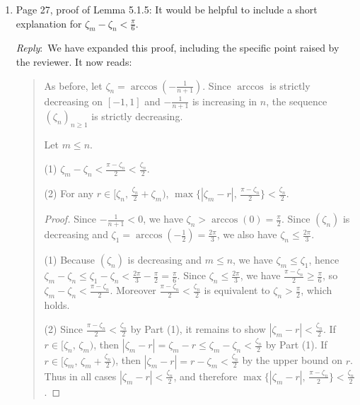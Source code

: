 \documentclass{amsart}
\newcommand{\ar}{\medskip\noindent\textit{Reply}:\ }
\begin{document}
\begin{enumerate}
		\item Page 27, proof of Lemma 5.1.5: It would be helpful to include a short explanation for $\zeta_m - \zeta_n < \frac{\pi}{6}$.

		\ar We have expanded this proof, including the specific point raised by the reviewer.
		It now reads:

		\medskip
		\begin{quote}
			As before, let $\zeta_n = \arccos\!\left(-\tfrac{1}{n+1}\right)$.
			Since $\arccos$ is strictly decreasing on $[-1,1]$ and $-\frac{1}{n+1}$ is increasing in $n$, the sequence $(\zeta_n)_{n\ge 1}$ is strictly decreasing.

			\lemma
			Let $m \leq n$.

			\noindent (1) $\zeta_m - \zeta_n < \tfrac{\pi - \zeta_n}{2} < \tfrac{\zeta_n}{2}$.

			\noindent (2) For any $r \in \big[\zeta_n,\, \tfrac{\zeta_n}{2}+\zeta_m\big)$, $\max\big\{|\zeta_m - r|,\, \tfrac{\pi - \zeta_n}{2}\big\} < \tfrac{\zeta_n}{2}$.

			\medskip
			\begin{proof}
				Since $-\frac{1}{n+1} < 0$, we have $\zeta_n > \arccos(0) = \tfrac{\pi}{2}$.
				Since $(\zeta_n)$ is decreasing and $\zeta_1 = \arccos\!\left(-\tfrac12\right) = \tfrac{2\pi}{3}$, we also have $\zeta_n \le \tfrac{2\pi}{3}$.

				\smallskip
				(1) Because $(\zeta_n)$ is decreasing and $m\le n$, we have $\zeta_m \le \zeta_1$, hence
				$\zeta_m - \zeta_n \le \zeta_1 - \zeta_n < \tfrac{2\pi}{3} - \tfrac{\pi}{2} = \tfrac{\pi}{6}$.
				Since $\zeta_n \le \tfrac{2\pi}{3}$, we have $\tfrac{\pi - \zeta_n}{2} \ge \tfrac{\pi}{6}$, so $\zeta_m - \zeta_n < \tfrac{\pi - \zeta_n}{2}$.
				Moreover $\tfrac{\pi - \zeta_n}{2} < \tfrac{\zeta_n}{2}$ is equivalent to $\zeta_n > \tfrac{\pi}{2}$, which holds.

				\smallskip
				(2) Since $\tfrac{\pi - \zeta_n}{2} < \tfrac{\zeta_n}{2}$ by Part (1), it remains to show $|\zeta_m - r| < \tfrac{\zeta_n}{2}$.
				If $r \in [\zeta_n,\, \zeta_m)$, then $|\zeta_m - r| = \zeta_m - r \le \zeta_m - \zeta_n < \tfrac{\zeta_n}{2}$ by Part (1).
				If $r \in [\zeta_m,\, \zeta_m + \tfrac{\zeta_n}{2})$, then $|\zeta_m - r| = r - \zeta_m < \tfrac{\zeta_n}{2}$ by the upper bound on $r$.
				Thus in all cases $|\zeta_m - r| < \tfrac{\zeta_n}{2}$, and therefore $\max\big\{|\zeta_m - r|,\, \tfrac{\pi - \zeta_n}{2}\big\} < \tfrac{\zeta_n}{2}$.
			\end{proof}
		\end{quote}


\end{enumerate}
\end{document}
